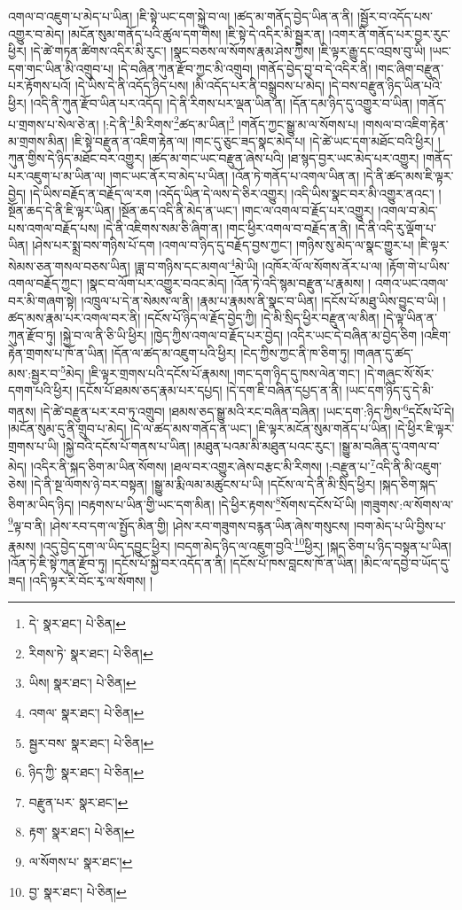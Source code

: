 འགལ་བ་འཇུག་པ་མེད་པ་ཡིན། །ཇི་སྟེ་ཡང་དག་སྐྱེ་བ་ལ། །ཚད་མ་གནོད་བྱེད་ཡིན་ན་ནི། །སྦྱོར་བ་འདོད་པས་འགྱུར་བ་མེད། །མངོན་སུམ་གནོད་པའི་ཚུལ་དག་གིས། །ཇི་སྟེ་དེ་འདིར་མི་སྦྱར་ན། །འགར་ནི་གནོད་པར་བྱར་རུང་ཕྱིར། །དེ་ཚེ་གཏན་ཚིགས་འདིར་མི་རུང་། །སྣང་བཅས་ལ་སོགས་རྣམ་ཤེས་ཀྱིས། །ཇི་ལྟར་རྒྱུ་དང་འབྲས་བུ་ཡི། །ཡང་དག་གང་ཡིན་མི་འགྲུབ་པ། །དེ་བཞིན་ཀུན་རྫོབ་ཀྱང་མི་འགྲུབ། །གནོད་བྱེད་བྱ་བ་དེ་འདིར་ནི། །གང་ཞིག་བརྫུན་པར་རྟོགས་པའོ། །དེ་ཡིས་དེ་ནི་འདོད་ཉིད་པས། །མི་འདོད་པར་ནི་བསྒྲུབས་པ་མེད། །དེ་བས་བརྫུན་ཉིད་ཡིན་པའི་ཕྱིར། །འདི་ནི་ཀུན་རྫོབ་ཡིན་པར་འདོད། །དེ་ནི་རིགས་པར་ལྡན་ཡིན་ན། །དོན་དམ་ཉིད་དུ་འགྱུར་བ་ཡིན། །གནོད་པ་གྲགས་པ་སེལ་ཅེ་ན། །:དེ་ནི་\footnote{དེ་  སྣར་ཐང་།  པེ་ཅིན། }མི་རིགས་\footnote{རིགས་ཏེ་  སྣར་ཐང་།  པེ་ཅིན། }ཚད་མ་ཡིན།\footnote{ཡིས།  སྣར་ཐང་།  པེ་ཅིན། } །གནོད་ཀྱང་སྒྱུ་མ་ལ་སོགས་པ། །གསལ་བ་འཇིག་རྟེན་མ་གྲགས་མིན། །ཇི་སྟེ་བརྫུན་ན་འཇིག་རྟེན་ལ། །གང་དུ་ཅུང་ཟད་སྣང་མེད་པ། །དེ་ཚེ་ཡང་དག་མཐོང་བའི་ཕྱིར། །ཀུན་གྱིས་དེ་ཉིད་མཐོང་བར་འགྱུར། །ཚད་མ་གང་ཡང་བརྫུན་ཞེས་པའི། །ཐ་སྙད་བྱར་ཡང་མེད་པར་འགྱུར། །གནོད་པར་འཇུག་པ་མ་ཡིན་ལ། །གང་ཡང་ནོར་བ་མེད་པ་ཡིན། །འོན་ཏེ་གནོད་པ་འགལ་ཡིན་ན། །དེ་ནི་ཚད་མས་ཇི་ལྟར་བྱེད། །དེ་ཡིས་བརྗོད་ན་བརྗོད་ལ་རག །འདོད་ཡིན་དེ་ལས་དེ་ཅིར་འགྱུར། །འདི་ཡིས་སྣང་བར་མི་འགྱུར་ནའང་། །སྔོན་ཆད་དེ་ནི་ཇི་ལྟར་ཡིན། །སྔོན་ཆད་འདི་ནི་མེད་ན་ཡང་། །གང་ལ་འགལ་བ་རྗོད་པར་འགྱུར། །འགལ་བ་མེད་པས་འགལ་བརྗོད་པས། །དེ་ནི་འཇིགས་སམ་ཅི་ཞིག་ན། །གང་ཕྱིར་འགལ་བ་བརྗོད་ན་ནི། །དེ་ནི་འདི་རུ་ལྡོག་པ་ཡིན། །ཤེས་པར་སྨྲ་བས་གཉིས་པོ་དག །འགལ་བ་ཉིད་དུ་བརྗོད་བྱས་ཀྱང་། །གཉིས་སུ་མེད་ལ་སྣང་གྱུར་པ། །ཇི་ལྟར་སེམས་ཅན་གསལ་བཅས་ཡིན། །ཟླ་བ་གཉིས་དང་མགལ་\footnote{འགལ་  སྣར་ཐང་།  པེ་ཅིན། }མེ་ཡི། །འཁོར་ལོ་ལ་སོགས་ནོར་པ་ལ། །རྟོག་གེ་པ་ཡིས་འགལ་བརྗོད་ཀྱང་། །སྣང་བ་ལོག་པར་འགྱུར་བའང་མེད། །འོན་ཏེ་འདི་སྙམ་བརྫུན་པ་རྣམས། །
འགའ་ཡང་འགལ་བར་མི་གཞག་སྟེ། །འཁྲུལ་པ་དེ་ན་སེམས་ལ་ནི། །རྣམ་པ་རྣམས་ནི་སྣང་བ་ཡིན། །དངོས་པོ་མཐུ་ཡིས་བྱུང་བ་ཡི། །ཚད་མས་རྣམ་པར་འགལ་བར་ནི། །དངོས་པོ་ཉིད་ལ་རྗོད་བྱེད་ཀྱི། །དེ་མི་སྲིད་ཕྱིར་བརྫུན་ལ་མིན། །དེ་ལྟ་ཡིན་ན་ཀུན་རྫོབ་ཏུ། །སྐྱེ་བ་ལ་ནི་ཅི་ཡི་ཕྱིར། །ཁྱེད་ཀྱིས་འགལ་བ་རྗོད་པར་བྱེད། །འདིར་ཡང་དེ་བཞིན་མ་བྱེད་ཅིག །འཇིག་རྟེན་གྲགས་པ་ཁོ་ན་ཡིན། །དོན་ལ་ཚད་མ་འཇུག་པའི་ཕྱིར། །ངེད་ཀྱིས་ཀྱང་ནི་ཁ་ཅིག་ཏུ། །གཞན་དུ་ཚད་མས་:སྦྱར་བ་\footnote{སྦྱར་བས་  སྣར་ཐང་།  པེ་ཅིན། }མེད། །ཇི་ལྟར་གྲགས་པའི་དངོས་པོ་རྣམས། །གང་དག་ཉིད་དུ་ཁས་ལེན་གང་། །དེ་གཞུང་སོ་སོར་དགག་པའི་ཕྱིར། །དངོས་པོ་ཐམས་ཅད་རྣམ་པར་དཔྱད། །དེ་དག་ཇི་བཞིན་དཔྱད་ན་ནི། །ཡང་དག་ཉིད་དུ་དེ་མི་གནས། །དེ་ཚེ་བརྫུན་པར་རབ་ཏུ་འགྲུབ། །ཐམས་ཅད་སྒྱུ་མའི་རང་བཞིན་བཞིན། །ཡང་དག་:ཉིད་ཀྱིས་\footnote{ཉིད་ཀྱི་  སྣར་ཐང་།  པེ་ཅིན། }དངོས་པོ་དེ། །མངོན་སུམ་དུ་ནི་གྲུབ་པ་མེད། །དེ་ལ་ཚད་མས་གནོད་ན་ཡང་། །ཇི་ལྟར་མངོན་སུམ་གནོད་པ་ཡིན། །དེ་ཕྱིར་ཇི་ལྟར་གྲགས་པ་ཡི། །སྐྱེ་བའི་དངོས་པོ་གནས་པ་ཡིན། །མཐུན་པའམ་མི་མཐུན་པའང་རུང་། །སྒྱུ་མ་བཞིན་དུ་འགལ་བ་མེད། །འདིར་ནི་སྐད་ཅིག་མ་ཡིན་སོགས། །ཐལ་བར་འགྱུར་ཞེས་བརྩང་མི་རིགས། །:བརྫུན་པ་\footnote{བརྫུན་པར་  སྣར་ཐང་། }འདི་ནི་མི་འཇུག་ཅེས། །དེ་ནི་སྔ་ལོགས་ཉེ་བར་བསྟན། །སྒྱུ་མ་རྨི་ལམ་མཚུངས་པ་ཡི། །དངོས་ལ་དེ་ནི་མི་སྲིད་ཕྱིར། །སྐད་ཅིག་སྐད་ཅིག་མ་ཡིད་ཉིད། །བརྟགས་པ་ཡིན་གྱི་ཡང་དག་མིན། །དེ་ཕྱིར་རྟགས་\footnote{རྟག་  སྣར་ཐང་།  པེ་ཅིན། }སོགས་དངོས་པོ་ཡི། །གཟུགས་:ལ་སོགས་ལ་\footnote{ལ་སོགས་པ་  སྣར་ཐང་། }ལྟ་བ་ནི། །ཤེས་རབ་དག་ལ་སྤྱོད་མིན་གྱི། །ཤེས་རབ་གཟུགས་བརྙན་ཡིན་ཞེས་གསུངས། །བག་མེད་པ་ཡི་བྱིས་པ་རྣམས། །འདུ་བྱེད་དག་ལ་ཡིད་དབྱུང་ཕྱིར། །བདག་མེད་ཉིད་ལ་འཇུག་བྱའི་\footnote{བྱ་  སྣར་ཐང་།  པེ་ཅིན། }ཕྱིར། །སྐད་ཅིག་པ་ཉིད་བསྟན་པ་ཡིན། །འོན་ཏེ་ཇི་སྟེ་ཀུན་རྫོབ་ཏུ། །དངོས་པོ་སྐྱེ་བར་འདོད་ན་ནི། །དངོས་པོ་ཁས་བླངས་ཁོ་ན་ཡིན། །མིང་ལ་དབྱེ་བ་ཡོད་དུ་ཟད། །འདི་ལྟར་རི་བོང་རྭ་ལ་སོགས། །
